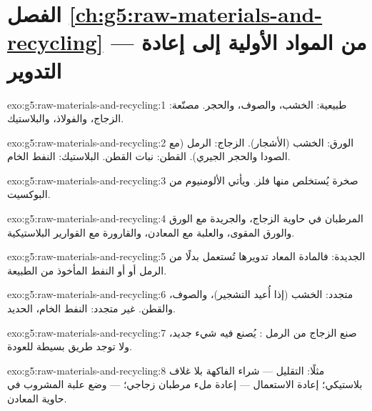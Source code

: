\section*{الفصل \ref{ch:g5:raw-materials-and-recycling} --- من المواد الأولية إلى إعادة التدوير}

\begin{solution}{exo:g5:raw-materials-and-recycling:1}
طبيعية: الخشب، والصوف، والحجر. مصنّعة: الزجاج، والفولاذ، والبلاستيك.
\end{solution}

\begin{solution}{exo:g5:raw-materials-and-recycling:2}
الورق: الخشب (الأشجار). الزجاج: الرمل (مع الصودا والحجر الجيري). القطن:
نبات القطن. البلاستيك: النفط الخام.
\end{solution}

\begin{solution}{exo:g5:raw-materials-and-recycling:3}
صخرة يُستخلص منها فلز. ويأتي الألومنيوم من البوكسيت.
\end{solution}

\begin{solution}{exo:g5:raw-materials-and-recycling:4}
المرطبان في حاوية الزجاج، والجريدة مع الورق والورق المقوى، والعلبة مع
المعادن، والقارورة مع القوارير البلاستيكية.
\end{solution}

\begin{solution}{exo:g5:raw-materials-and-recycling:5}
 الجديدة: فالمادة المعاد تدويرها تُستعمل بدلًا من الرمل أو
 أو النفط المأخوذ من الطبيعة.
\end{solution}

\begin{solution}{exo:g5:raw-materials-and-recycling:6}
متجدد: الخشب (إذا أُعيد التشجير)، والصوف، والقطن. غير متجدد: النفط
الخام،  الحديد.
\end{solution}

\begin{solution}{exo:g5:raw-materials-and-recycling:7}
صنع الزجاج من الرمل : يُصنع فيه شيء جديد، ولا توجد طريق
بسيطة للعودة.
\end{solution}

\begin{solution}{exo:g5:raw-materials-and-recycling:8}
مثلًا: التقليل --- شراء الفاكهة بلا غلاف بلاستيكي؛ إعادة الاستعمال ---
إعادة ملء مرطبان زجاجي؛  --- وضع علبة المشروب في حاوية المعادن.
\end{solution}

